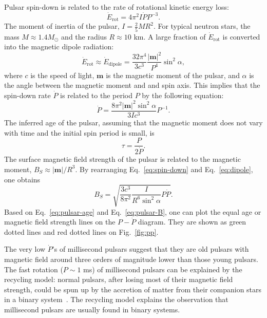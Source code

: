\documentclass[doublespace,nopageskip]{VTthesis}
\begin{document}
Pulsar spin-down is related to the rate of rotational kinetic energy loss:
\begin{equation}\label{eq:spin-down}
    \dot{E}_\mathrm{rot} = 4\pi^2 I \dot{P}P^{-3}.
\end{equation}
The moment of inertia of the pulsar, $I = \frac{2}{5}MR^2$. For typical neutron stars, the mass $M \approx 1.4 M_\odot$ and the radius $R \approx 10$ km. 
A large fraction of $\dot{E}_\mathrm{rot}$ is converted into the magnetic dipole radiation:
\begin{equation}\label{eq:dipole}
\dot{E}_\mathrm{rot} \approx \dot{E}_\mathrm{dipole} = \frac{32\pi^4}{3c^3}\frac{|\bm{m}|^2}{P^4}\sin^2\alpha,
\end{equation}
where $c$ is the speed of light, $\bm{m}$ is the magnetic moment of the pulsar, and $\alpha$ is the angle between the magnetic moment and and spin axis. This implies that the spin-down rate $\dot{P}$ is related to the period $P$ by the following equation:
\begin{equation}
    \dot{P} = \frac{8\pi^2|\bm{m}|^2\sin^2\alpha}{3Ic^3}P^{-1}.
\end{equation}
The inferred age of the pulsar, assuming that the magnetic moment does not vary with time and the initial spin period is small, is
\begin{equation}\label{eq:pulsar-age}
    \tau = \frac{P}{2\dot{P}}.
\end{equation}
The surface magnetic field strength of the pulsar is related to the magnetic moment, $B_S\approx|\bm{m}|/R^3$. By rearranging Eq.~\ref{eq:spin-down} and Eq.~\ref{eq:dipole}, one obtains
\begin{equation}\label{eq:pulsar-B}
    B_S = \sqrt{\dfrac{3c^3}{8\pi^2}\dfrac{I}{R^6\sin^2\alpha}P\dot{P}}.
\end{equation}
Based on Eq.~\ref{eq:pulsar-age} and Eq.~\ref{eq:pulsar-B}, one can plot the equal age or magnetic field strength lines on the $P-\dot{P}$ diagram. They are shown as green dotted lines and red dotted lines on Fig.~\ref{fig:pp}.

The very low $\dot{P}$'s of millisecond pulsars suggest that they are old pulsars with magnetic field around three orders of magnitude lower than those young pulsars. The fast rotation ($P \sim 1$ ms) of millisecond pulsars can be explained by the recycling model: normal pulsars, after losing most of their magnetic field strength, could be spun up by the accretion of matter from their companion stars in a binary system~\cite{1982Natur.300..728A,1998Natur.394..344W}. The recycling model explains the observation that millisecond pulsars are usually found in binary systems.
\end{document}
